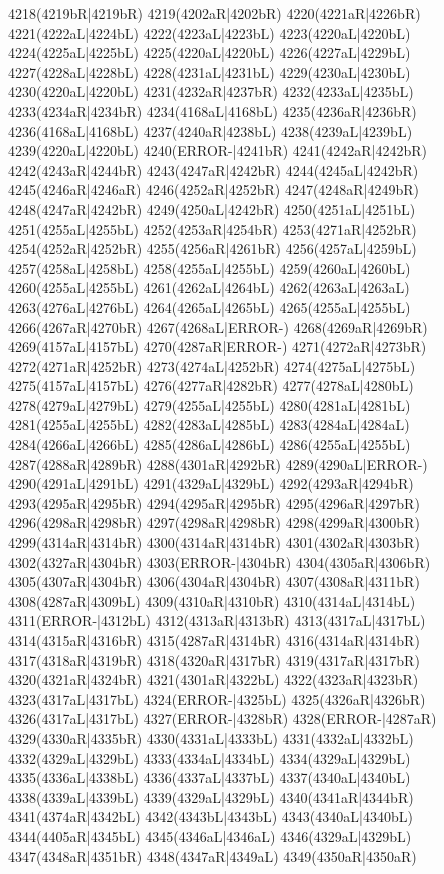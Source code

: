 4218(4219bR|4219bR) 4219(4202aR|4202bR) 4220(4221aR|4226bR) \\4221(4222aL|4224bL) 4222(4223aL|4223bL) 4223(4220aL|4220bL) 4224(4225aL|4225bL) 4225(4220aL|4220bL) 4226(4227aL|4229bL) 4227(4228aL|4228bL) 4228(4231aL|4231bL) 4229(4230aL|4230bL) \\4230(4220aL|4220bL) 4231(4232aR|4237bR) 4232(4233aL|4235bL) 4233(4234aR|4234bR) 4234(4168aL|4168bL) 4235(4236aR|4236bR) 4236(4168aL|4168bL) 4237(4240aR|4238bL) 4238(4239aL|4239bL) \\4239(4220aL|4220bL) 4240(ERROR-|4241bR) 4241(4242aR|4242bR) 4242(4243aR|4244bR) 4243(4247aR|4242bR) 4244(4245aL|4242bR) 4245(4246aR|4246aR) 4246(4252aR|4252bR) 4247(4248aR|4249bR) \\4248(4247aR|4242bR) 4249(4250aL|4242bR) 4250(4251aL|4251bL) 4251(4255aL|4255bL) 4252(4253aR|4254bR) 4253(4271aR|4252bR) 4254(4252aR|4252bR) 4255(4256aR|4261bR) 4256(4257aL|4259bL) \\4257(4258aL|4258bL) 4258(4255aL|4255bL) 4259(4260aL|4260bL) 4260(4255aL|4255bL) 4261(4262aL|4264bL) 4262(4263aL|4263aL) 4263(4276aL|4276bL) 4264(4265aL|4265bL) 4265(4255aL|4255bL) \\4266(4267aR|4270bR) 4267(4268aL|ERROR-) 4268(4269aR|4269bR) 4269(4157aL|4157bL) 4270(4287aR|ERROR-) 4271(4272aR|4273bR) 4272(4271aR|4252bR) 4273(4274aL|4252bR) 4274(4275aL|4275bL) \\4275(4157aL|4157bL) 4276(4277aR|4282bR) 4277(4278aL|4280bL) 4278(4279aL|4279bL) 4279(4255aL|4255bL) 4280(4281aL|4281bL) 4281(4255aL|4255bL) 4282(4283aL|4285bL) 4283(4284aL|4284aL) \\4284(4266aL|4266bL) 4285(4286aL|4286bL) 4286(4255aL|4255bL) 4287(4288aR|4289bR) 4288(4301aR|4292bR) 4289(4290aL|ERROR-) 4290(4291aL|4291bL) 4291(4329aL|4329bL) 4292(4293aR|4294bR) \\4293(4295aR|4295bR) 4294(4295aR|4295bR) 4295(4296aR|4297bR) 4296(4298aR|4298bR) 4297(4298aR|4298bR) 4298(4299aR|4300bR) 4299(4314aR|4314bR) 4300(4314aR|4314bR) 4301(4302aR|4303bR) \\4302(4327aR|4304bR) 4303(ERROR-|4304bR) 4304(4305aR|4306bR) 4305(4307aR|4304bR) 4306(4304aR|4304bR) 4307(4308aR|4311bR) 4308(4287aR|4309bL) 4309(4310aR|4310bR) 4310(4314aL|4314bL) \\4311(ERROR-|4312bL) 4312(4313aR|4313bR) 4313(4317aL|4317bL) 4314(4315aR|4316bR) 4315(4287aR|4314bR) 4316(4314aR|4314bR) 4317(4318aR|4319bR) 4318(4320aR|4317bR) 4319(4317aR|4317bR) \\4320(4321aR|4324bR) 4321(4301aR|4322bL) 4322(4323aR|4323bR) 4323(4317aL|4317bL) 4324(ERROR-|4325bL) 4325(4326aR|4326bR) 4326(4317aL|4317bL) 4327(ERROR-|4328bR) 4328(ERROR-|4287aR) \\4329(4330aR|4335bR) 4330(4331aL|4333bL) 4331(4332aL|4332bL) 4332(4329aL|4329bL) 4333(4334aL|4334bL) 4334(4329aL|4329bL) 4335(4336aL|4338bL) 4336(4337aL|4337bL) 4337(4340aL|4340bL) \\4338(4339aL|4339bL) 4339(4329aL|4329bL) 4340(4341aR|4344bR) 4341(4374aR|4342bL) 4342(4343bL|4343bL) 4343(4340aL|4340bL) 4344(4405aR|4345bL) 4345(4346aL|4346aL) 4346(4329aL|4329bL) \\4347(4348aR|4351bR) 4348(4347aR|4349aL) 4349(4350aR|4350aR) 